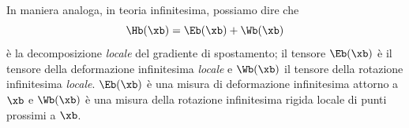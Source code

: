 In maniera analoga, in teoria infinitesima, possiamo dire che 
\begin{equation}
\Hb(\xb)=\Eb(\xb)+\Wb(\xb)
\end{equation}
è la decomposizione \textit{locale} del gradiente di spostamento; il tensore $\Eb(\xb)$ è il tensore della deformazione infinitesima \textit{locale} e  $\Wb(\xb)$ il tensore della rotazione infinitesima \textit{locale}. $\Eb(\xb)$ è una misura di deformazione infinitesima attorno a $\xb$ e $\Wb(\xb)$ è una misura della rotazione infinitesima rigida locale di punti prossimi a $\xb$.
%
%
